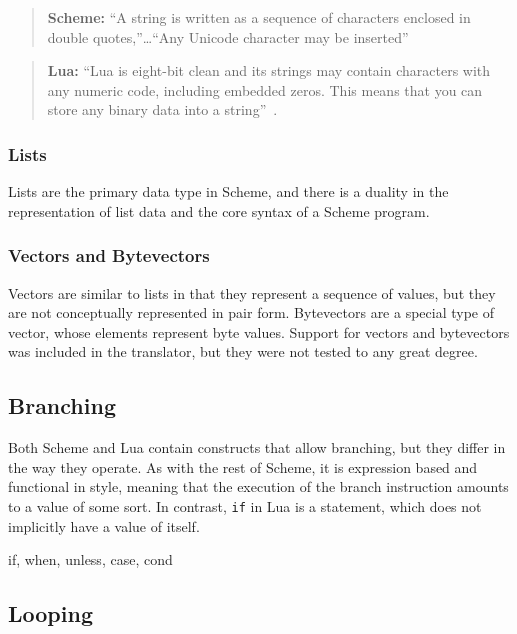 \begin{quote}\textbf{Scheme:}
``A string is written as a sequence of characters enclosed in double
quotes,''\ldots ``Any Unicode character may be inserted''~\cite[Sec~6.8]{tspl}
\end{quote}

\begin{quote}\textbf{Lua:}
``Lua is eight-bit clean and its strings may contain characters with any numeric
code, including embedded zeros. This means that you can store any binary data
into a string''~\cite[p.11]{luabook}.
\end{quote}

\subsubsection{Lists}

Lists are the primary data type in Scheme, and there is a duality in the
representation of list data and the core syntax of a Scheme program.

\subsubsection{Vectors and Bytevectors}

Vectors are similar to lists in that they represent a sequence of values, but
they are not conceptually represented in pair form. Bytevectors are a special
type of vector, whose elements represent byte values. Support for vectors and
bytevectors was included in the translator, but they were not tested to any
great degree. 

\subsection{Branching}

Both Scheme and Lua contain constructs that allow branching, but they differ in
the way they operate. As with the rest of Scheme, it is expression based and
functional in style, meaning that the execution of the branch instruction
amounts to a value of some sort. In contrast, \texttt{if} in Lua is a statement,
which does not implicitly have a value of itself.

if, when, unless, case, cond

\subsection{Looping}

